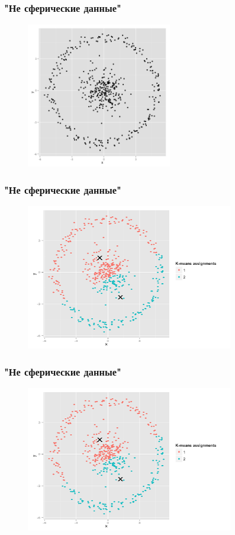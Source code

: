 \documentclass[12pt]{beamer}
\begin{document}
\begin{frame}\frametitle{"Не сферические данные"}
\begin{figure}[htbp]
  \includegraphics[height=180pt, keepaspectratio = true]{images/non_spherical-1}  
\end{figure}
\end{frame}

\begin{frame}\frametitle{"Не сферические данные"}
\begin{figure}[htbp]
  \includegraphics[height=180pt, keepaspectratio = true]{images/non_spherical-2}  
\end{figure}
\end{frame}

\begin{frame}\frametitle{"Не сферические данные"}
\begin{figure}[htbp]
  \includegraphics[height=180pt, keepaspectratio = true]{images/non_spherical-2}  
\end{figure}
\end{frame}
\end{document}
